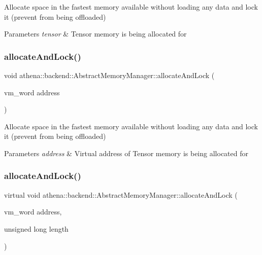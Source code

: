 Allocate space in the fastest memory available without loading any data and lock it (prevent from being offloaded) 
\begin{DoxyParams}{Parameters}
{\em tensor} & Tensor memory is being allocated for \\
\hline
\end{DoxyParams}
\mbox{\label{classathena_1_1backend_1_1_abstract_memory_manager_ab5305b3d1ab91960bf179ce0be166120}} 
\subsubsection{\texorpdfstring{allocate\+And\+Lock()}{allocateAndLock()}\hspace{0.1cm}{\footnotesize\ttfamily [2/3]}}
{\footnotesize\ttfamily void athena\+::backend\+::\+Abstract\+Memory\+Manager\+::allocate\+And\+Lock (\begin{DoxyParamCaption}\item[{vm\+\_\+word}]{address }\end{DoxyParamCaption})}

Allocate space in the fastest memory available without loading any data and lock it (prevent from being offloaded) 
\begin{DoxyParams}{Parameters}
{\em address} & Virtual address of Tensor memory is being allocated for \\
\hline
\end{DoxyParams}
\mbox{\label{classathena_1_1backend_1_1_abstract_memory_manager_a1b80008e94c21d5ac87f9a45d3f212a8}} 
\subsubsection{\texorpdfstring{allocate\+And\+Lock()}{allocateAndLock()}\hspace{0.1cm}{\footnotesize\ttfamily [3/3]}}
{\footnotesize\ttfamily virtual void athena\+::backend\+::\+Abstract\+Memory\+Manager\+::allocate\+And\+Lock (\begin{DoxyParamCaption}\item[{vm\+\_\+word}]{address,  }\item[{unsigned long}]{length }\end{DoxyParamCaption})\hspace{0.3cm}{\ttfamily [pure virtual]}}

